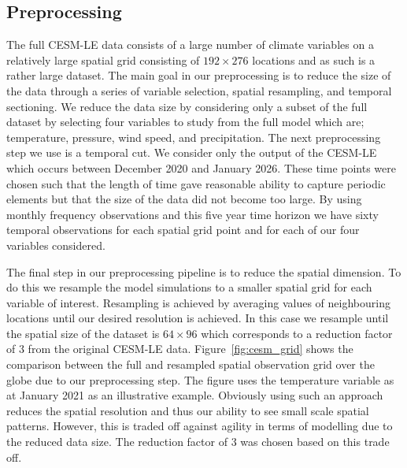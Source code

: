 \subsection{Preprocessing \label{sec:preprocessing}}
 The full CESM-LE data consists of a large number of climate variables on a relatively large spatial grid consisting of $192 \times 276$ locations and as such is a rather large dataset. 
 The main goal in our preprocessing is to reduce the size of the data through a series of variable selection, spatial resampling, and temporal sectioning.
 We reduce the data size by considering only a subset of the full dataset by selecting four variables to study from the full model which are; temperature, pressure, wind speed, and precipitation. 
 The next preprocessing step we use is a temporal cut.
 We consider only the output of the CESM-LE which occurs between December 2020 and January 2026. 
 These time points were chosen such that the length of time gave reasonable ability to capture periodic elements but that the size of the data did not become too large.
 By using monthly frequency observations and this five year time horizon we have sixty temporal observations for each spatial grid point and for each of our four variables considered. 
 
 The final step in our preprocessing pipeline is to reduce the spatial dimension.
 To do this we resample the model simulations to a smaller spatial grid for each variable of interest.
 Resampling is achieved by averaging values of neighbouring locations until our desired resolution is achieved.
 In this case we resample until the spatial size of the dataset is $64 \times 96$ which corresponds to a reduction factor of $3$ from the original CESM-LE data.
 Figure~\ref{fig:cesm_grid} shows the comparison between the full and resampled spatial observation grid over the globe due to our preprocessing step.
 The figure uses the temperature variable as at January 2021 as an illustrative example. 
 Obviously using such an approach reduces the spatial resolution and thus our ability to see small scale spatial patterns.
 However, this is traded off against agility in terms of modelling due to the reduced data size.
 The reduction factor of $3$ was chosen based on this trade off.
 
